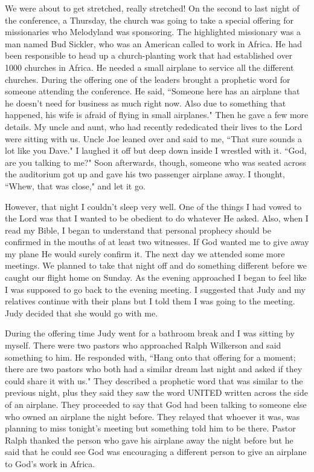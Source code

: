 \documentclass[oneside,12pt]{book}
\begin{document}
We were about to get stretched, really stretched! On the second to last night of the conference, a Thursday, the church was going to take a special offering for missionaries who Melodyland was sponsoring. The highlighted missionary was a man named Bud Sickler, who was an American called to work in Africa. He had been responsible to head up a church-planting work that had established over 1000 churches in Africa. He needed a small airplane to service all the different churches. During the offering one of the leaders brought a prophetic word for someone attending the conference. He said, ``Someone here has an airplane that he doesn't need for business as much right now. Also due to something that happened, his wife is afraid of flying in small airplanes." Then he gave a few more details. My uncle and aunt, who had recently rededicated their lives to the Lord were sitting with us. Uncle Joe leaned over and said to me, ``That sure sounds a lot like you Dave." I laughed it off but deep down inside I wrestled with it. ``God, are you talking to me?" Soon afterwards, though, someone who was seated across the auditorium got up and gave his two passenger airplane away. I thought, ``Whew, that was close," and let it go.

However, that night I couldn't sleep very well. One of the things I had vowed to the Lord was that I wanted to be obedient to do whatever He asked. Also, when I read my Bible, I began to understand that personal prophecy should be confirmed in the mouths of at least two witnesses. If God wanted me to give away my plane He would surely confirm it. The next day we attended some more meetings. We planned to take that night off and do something different before we caught our flight home on Sunday. As the evening approached I began to feel like I was supposed to go back to the evening meeting. I suggested that Judy and my relatives continue with their plans but I told them I was going to the meeting. Judy decided that she would go with me. 

During the offering time Judy went for a bathroom break and I was sitting by myself. There were two pastors who approached Ralph Wilkerson and said something to him. He responded with, ``Hang onto that offering for a moment; there are two pastors who both had a similar dream last night and asked if they could share it with us." They described a prophetic word that was similar to the previous night, plus they said they saw the word UNITED written across the side of an airplane. They proceeded to say that God had been talking to someone else who owned an airplane the night before. They relayed that whoever it was, was planning to miss tonight's meeting but something told him to be there. Pastor Ralph thanked the person who gave his airplane away the night before but he said that he could see God was encouraging a different person to give an airplane to God's work in Africa. 
\end{document}

